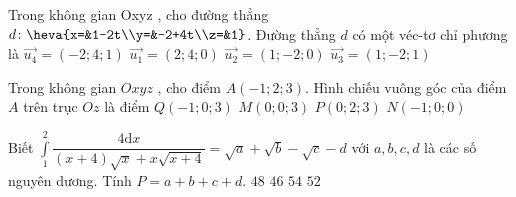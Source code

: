 \begin{ex}%
	Trong không gian Oxyz , cho đường thẳng $d\colon\heva{x=&1-2t\\y=&-2+4t\\z=&1}$. Đường thẳng $d$ có một véc-tơ chỉ phương là
	\choice
	{$\vec{u_4}=(-2;4;1)$}
	{$\vec{u_1}=(2;4;0)$}
	{\True $\vec{u_2}=(1;-2;0)$}
	{$\vec{u_3}=(1;-2;1)$}
\end{ex}
\begin{ex}%
	Trong không gian $Oxyz$ , cho điểm $A(-1;2;3)$. Hình chiếu vuông góc của điểm  $A$ trên trục $Oz$ là điểm
	\choice
	{$Q(-1;0;3)$}
	{\True $M(0;0;3)$}
	{$P(0;2;3)$}
	{$N(-1;0;0)$}
\end{ex}
\begin{ex}%
	Biết $\displaystyle \int \limits_{1}^2 \dfrac{4\mathrm{d}x}{(x+4)\sqrt{x}+x\sqrt{x+4}}=\sqrt{a}+\sqrt{b}-\sqrt{c}-d$ với $a,b,c,d$ là các số nguyên dương. Tính $P=a+b+c+d$.
	\choice
	{$48$}
	{$46$}
	{\True $54$}
	{$52$}
\end{ex}
